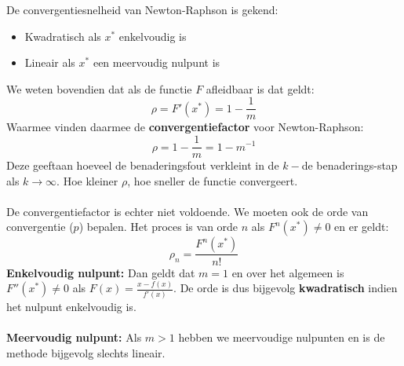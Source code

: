 De convergentiesnelheid van Newton-Raphson is gekend:
\begin{itemize}
	\item Kwadratisch als $x^{*}$ enkelvoudig is
	\item Lineair als $x^{*}$ een meervoudig nulpunt is
\end{itemize}
We weten bovendien dat als de functie $F$ afleidbaar is dat geldt:
\[
\rho = F'(x^{*})=1-\frac{1}{m}
\] 
Waarmee vinden daarmee de \textbf{convergentiefactor} voor Newton-Raphson:
\[
\rho=1-\frac{1}{m}=1-m^{-1}
\] 
Deze geeftaan hoeveel de benaderingsfout verkleint in de $k-$de benaderings-stap als $k \rightarrow \infty$. Hoe kleiner $\rho$, hoe sneller de functie convergeert.\\
\\
De convergentiefactor is echter niet voldoende. We moeten ook de orde van convergentie ($p$) bepalen. Het proces is van orde $n$ als $F^{n}(x^{*}) \neq 0$ en er geldt:
\[
\rho_n = \frac{F^{n}(x^{*})}{n!}
\]
\textbf{Enkelvoudig nulpunt:} Dan geldt dat $m = 1$ en over het algemeen is $F''(x^{*}) \neq 0$ als $F(x)=\frac{x-f(x)}{f'(x)}$. De orde is dus bijgevolg \textbf{kwadratisch} indien het nulpunt enkelvoudig is. \\\\
\textbf{Meervoudig nulpunt:} Als $m > 1$ hebben we meervoudige nulpunten en is de methode bijgevolg slechts lineair.